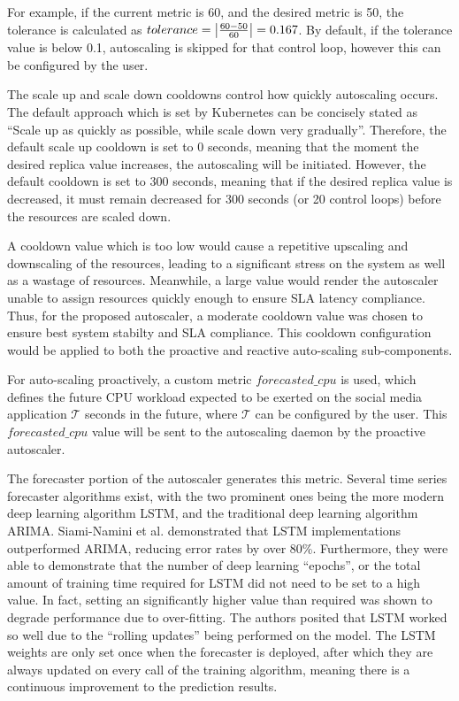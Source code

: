 For example, if the current metric is 60, and the desired metric is 50, the tolerance is calculated as $ tolerance = \abs{ \frac{60 - 50}{60}} = 0.167$. By default, if the tolerance value is below 0.1, autoscaling is skipped for that control loop, however this can be configured by the user.\par

The scale up and scale down cooldowns control how quickly autoscaling occurs. The default approach which is set by Kubernetes can be concisely stated as ``Scale up as quickly as possible, while scale down very gradually''. Therefore, the default scale up cooldown is set to 0 seconds, meaning that the moment the desired replica value increases, the autoscaling will be initiated. However, the default cooldown is set to 300 seconds, meaning that if the desired replica value is decreased, it must remain decreased for 300 seconds (or 20 control loops) before the resources are scaled down.\par

A cooldown value which is too low would cause a repetitive upscaling and downscaling of the resources, leading to a significant stress on the system as well as a wastage of resources. Meanwhile, a large value would render the autoscaler unable to assign resources quickly enough to ensure SLA latency compliance. Thus, for the proposed autoscaler, a moderate cooldown value was chosen to ensure best system stabilty and SLA compliance. This cooldown configuration would be applied to both the proactive and reactive auto-scaling sub-components.\par

For auto-scaling proactively, a custom metric $forecasted\_cpu$ is used, which defines the future CPU workload expected to be exerted on the social media application $\mathcal{T}$ seconds in the future, where $\mathcal{T}$ can be configured by the user. This $forecasted\_cpu$ value will be sent to the autoscaling daemon by the proactive autoscaler.\par

The forecaster portion of the autoscaler generates this metric. Several time series forecaster algorithms exist, with the two prominent ones being the more modern deep learning algorithm LSTM, and the traditional deep learning algorithm ARIMA. Siami-Namini et al. \cite{siami2018comparison} demonstrated that LSTM implementations outperformed ARIMA, reducing error rates by over 80\%. Furthermore, they were able to demonstrate that the number of deep learning ``epochs'', or the total amount of training time required for LSTM did not need to be set to a high value. In fact, setting an significantly higher value than required was shown to degrade performance due to over-fitting. The authors posited that LSTM worked so well due to the ``rolling updates'' being performed on the model. The LSTM weights are only set once when the forecaster is deployed, after which they are always updated on every call of the training algorithm, meaning there is a continuous improvement to the prediction results.\par


